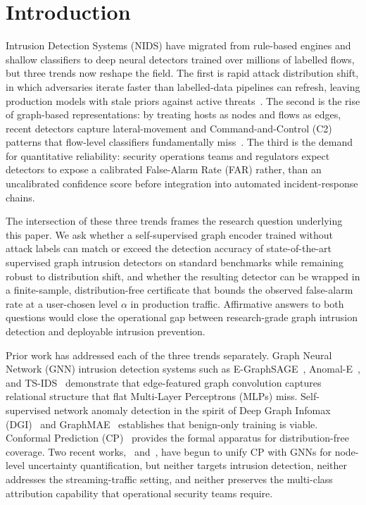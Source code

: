 \documentclass{ieeeaccess}
\begin{document}
\section{Introduction}
 Intrusion Detection Systems (NIDS) have migrated
from rule-based engines and shallow classifiers to deep neural detectors
trained over millions of labelled flows, but three trends now reshape the
field. The first is rapid attack distribution shift, in which adversaries
iterate faster than labelled-data pipelines can refresh, leaving production
models with stale priors against active threats~\cite{layeghy2023,bilot2023survey,sommer2010closedworld}.
The second is the rise of graph-based representations: by treating hosts as
nodes and flows as edges, recent detectors capture lateral-movement and
Command-and-Control (C2) patterns that flow-level classifiers fundamentally
miss~\cite{lo2022egraphsage,caville2022anomale}. The third is the demand
for quantitative reliability: security operations teams and regulators
expect detectors to expose a calibrated False-Alarm Rate (FAR) rather, than
an uncalibrated confidence score before integration into automated
incident-response chains.

The intersection of these three trends frames the research question
underlying this paper. We ask whether a self-supervised graph encoder
trained without attack labels can match or exceed the detection accuracy
of state-of-the-art supervised graph intrusion detectors on standard
benchmarks while remaining robust to distribution shift, and whether the
resulting detector can be wrapped in a finite-sample, distribution-free
certificate that bounds the observed false-alarm rate at a user-chosen
level $\alpha$ in production traffic. Affirmative answers to both
questions would close the operational gap between
research-grade graph intrusion detection and deployable
intrusion prevention.

Prior work has addressed each of the three trends separately. Graph Neural
Network (GNN) intrusion detection systems such as E-GraphSAGE~\cite{lo2022egraphsage},
Anomal-E~\cite{caville2022anomale}, and TS-IDS~\cite{nguyen2023tsids}
demonstrate that edge-featured graph convolution captures relational
structure that flat Multi-Layer Perceptrons (MLPs) miss. Self-supervised
network anomaly detection in the spirit of Deep Graph Infomax (DGI)~\cite{velickovic2019dgi}
and GraphMAE~\cite{hou2022graphmae} establishes that benign-only training
is viable. Conformal Prediction
(CP)~\cite{vovk2022alrw,angelopoulos2023gentle} provides the formal
apparatus for distribution-free coverage. Two recent
works,~\cite{huang2023cfgnn} and~\cite{zargarbashi2023daps}, have begun to
unify CP with GNNs for node-level uncertainty quantification, but neither
targets intrusion detection, neither addresses the streaming-traffic
setting, and neither preserves the multi-class attribution capability that
operational security teams require.
\end{document}
